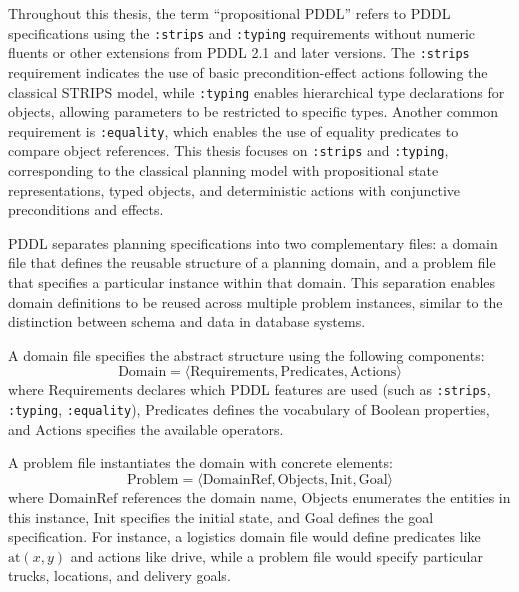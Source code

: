 Throughout this thesis, the term ``propositional \ac{PDDL}'' refers to \ac{PDDL} specifications using the \texttt{:strips} and \texttt{:typing} requirements without numeric fluents or other extensions from \ac{PDDL} 2.1 and later versions. The \texttt{:strips} requirement indicates the use of basic precondition-effect actions following the classical \ac{STRIPS} model, while \texttt{:typing} enables hierarchical type declarations for objects, allowing parameters to be restricted to specific types. Another common requirement is \texttt{:equality}, which enables the use of equality predicates to compare object references. This thesis focuses on \texttt{:strips} and \texttt{:typing}, corresponding to the classical planning model with propositional state representations, typed objects, and deterministic actions with conjunctive preconditions and effects.

\ac{PDDL} separates planning specifications into two complementary files: a domain file that defines the reusable structure of a planning domain, and a problem file that specifies a particular instance within that domain. This separation enables domain definitions to be reused across multiple problem instances, similar to the distinction between schema and data in database systems.

A domain file specifies the abstract structure using the following components:
\begin{equation*}
    \text{Domain} = \langle \text{Requirements}, \text{Predicates}, \text{Actions} \rangle
\end{equation*}
where $\text{Requirements}$ declares which \ac{PDDL} features are used (such as \texttt{:strips}, \texttt{:typing}, \texttt{:equality}), $\text{Predicates}$ defines the vocabulary of Boolean properties, and $\text{Actions}$ specifies the available operators.

A problem file instantiates the domain with concrete elements:
\begin{equation*}
    \text{Problem} = \langle \text{DomainRef}, \text{Objects}, \text{Init}, \text{Goal} \rangle
\end{equation*}
where $\text{DomainRef}$ references the domain name, $\text{Objects}$ enumerates the entities in this instance, $\text{Init}$ specifies the initial state, and $\text{Goal}$ defines the goal specification. For instance, a logistics domain file would define predicates like $\text{at}(x, y)$ and actions like $\text{drive}$, while a problem file would specify particular trucks, locations, and delivery goals.

